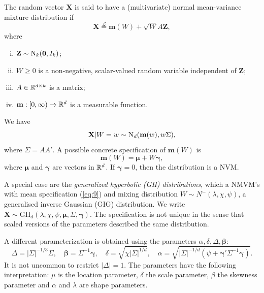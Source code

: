 \begin{definition}
The random vector $\mathbf {X}$ is said to have a (multivariate)
normal mean-variance mixture distribution if
\begin{equation*}
  \mathbf X \stackrel{\mathcal L}{=} \mathbf m(W) + \sqrt{W} A \mathbf Z,
\end{equation*}
where
\begin{enumerate}[(i)]
\item $\mathbf Z \sim {\rm N}_k (\mathbf 0, I_k)$;
\item $W\geq 0$ is a non-negative, scalar-valued random variable
  independent of $\mathbf Z$;
\item $A\in {\mathbb{R}}^{d\times k}$ is a matrix;
\item $\mathbf m:[0,\infty)\rightarrow {\mathbb{R}}^d$ is a measurable
  function. 
\end{enumerate}
We have
\begin{equation*}
  \mathbf X|W=w \sim {\rm N}_d(\mathbf m(w), w\Sigma),
\end{equation*}
where $\Sigma=A A'$. A possible concrete specification of $\mathbf
m(W)$ is
\begin{equation}
  \label{eq:9}
  \mathbf m(W) = \mathbf \mu + W\mathbf \gamma,
\end{equation}
where $\mathbf\mu$ and $\mathbf\gamma$ are vectors in ${\mathbb{R}}^d$. If
$\mathbf\gamma=0$, then the distribution is a NVM. 

A special case are the {\em generalized hyperbolic (GH)
  distributions}, which a NMVM's with mean specification (\ref{eq:9})
and mixing distribution $W\sim N^{-}(\lambda, \chi, \psi)$, a
generalised inverse Gaussian (GIG) distribution. We write $\mathbf
X\sim \text{GH}_d(\lambda, \chi, \psi, \mathbf \mu, \Sigma,
\mathbf\gamma)$. The specification is not unique in the sense that
scaled versions of the parameters described the same
distribution. 

A different parameterization is obtained using the parameters $\alpha,
\delta, \Delta, \mathbf \beta$:
\begin{equation*}
  \Delta = |\Sigma|^{-1/3} \Sigma, \quad \mathbf\beta = \Sigma^{-1}
  \mathbf \gamma, \quad \delta =\sqrt{\chi |\Sigma|^{1/d}}, \quad
  \alpha = \sqrt{|\Sigma|^{-1/d} (\psi + \mathbf\gamma' \Sigma^{-1}
    \mathbf\gamma)}. 
\end{equation*}
It is not uncommon to restrict $|\Delta|=1$. The parameters have the
following interpretation: $\mu$ is the location parameter, $\delta$
the scale parameter, $\beta$ the skewness parameter and $\alpha$ and
$\lambda$ are shape parameters. 


\end{definition}

